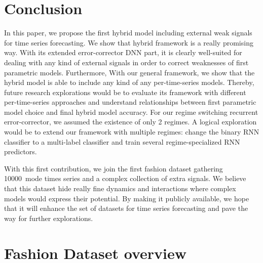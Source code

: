 \documentclass{article} %
\newcommand{\numberts}{10000}
\begin{document}
\section{Conclusion}
\label{sec:conclusion}

In this paper, we propose the first hybrid model including external weak signals for time series forecasting. We show that hybrid framework is a really promising way. With its extended error-corrector DNN part, it is clearly well-suited for dealing with any kind of external signals in order to correct weaknesses of first parametric models. Furthermore, With our general framework, we show that the hybrid model is able to include any kind of any per-time-series models. Thereby, future research explorations would be to evaluate its framework with different per-time-series approaches and understand relationships between first parametric model choice and final hybrid model accuracy. For our regime switching recurrent error-corrector, we assumed the existence of only 2 regimes. A logical exploration would be to extend our framework with multiple regimes: change the binary RNN classifier to a multi-label classifier and train several regime-specialized RNN predictors.

With this first contribution, we join the first fashion dataset gathering \numberts\ mode times series and a complex collection of extra signals. We believe that this dataset hide really fine dynamics and interactions where complex models would express their potential. By making it publicly available, we hope that it will enhance the set of datasets for time series forecasting and pave the way for further explorations.





\appendix

\section{Fashion Dataset overview}
\end{document}
